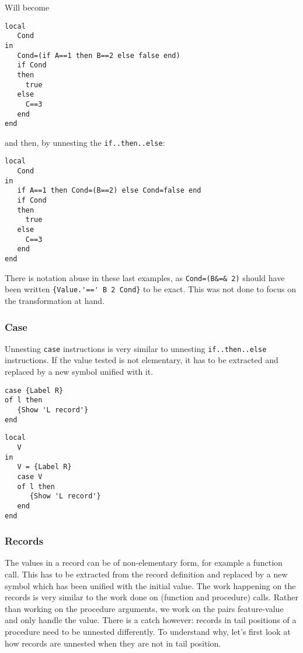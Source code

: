 \documentclass[a4paper]{memoir}
\begin{document}
Will become

\begin{lstlisting}
local
   Cond
in
   Cond=(if A==1 then B==2 else false end)
   if Cond
   then
     true
   else
     C==3
   end
end
\end{lstlisting}
and then, by unnesting the \lstinline!if..then..else!:
\begin{lstlisting}
local
   Cond
in
   if A==1 then Cond=(B==2) else Cond=false end
   if Cond
   then
     true
   else
     C==3
   end
end
\end{lstlisting}

There is notation abuse in these last examples, as \lstinline!Cond=(B&=& 2)!
should have been written \lstinline!{Value.'==' B 2 Cond}! to be exact. This was
not done to focus on the transformation at hand.

\subsubsection{Case}
Unnesting \lstinline!case! instructions is very similar to unnesting
\lstinline!if..then..else! instructions. If the value tested is not elementary,
it has to be extracted and replaced by a new symbol unified with it.
\begin{lstlisting}
case {Label R}
of l then
   {Show 'L record'}
end
\end{lstlisting}

\begin{lstlisting}
local
   V
in
   V = {Label R}
   case V 
   of l then
      {Show 'L record'}
   end
end
\end{lstlisting}
   

\subsubsection{Records}\label{sec:arch:unnester:records}
The values in a record can be of non-elementary form, for example a function call. This has to be extracted from the record definition and replaced by a new symbol which has been unified with the initial value. The work happening on the records is very similar to the work done on (function and procedure) calls. Rather than working on the procedure arguments, we work on the pairs feature-value and only handle the value. 
There is a catch however: records in tail positions of a procedure need to be unnested
differently. To understand why, let's first look at how records are unnested
when they are not in tail position.
\end{document}
